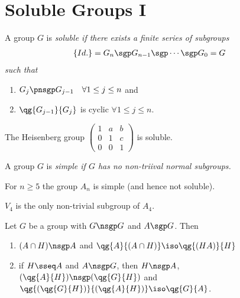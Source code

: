 \documentclass[a4paper]{article}
\begin{document}
\section{Soluble Groups I}

\begin{tdefinition}
  A group \( G \) is \it{soluble} if there exists a finite series of subgroups \begin{align*}
    \left\{ Id. \right\} &= G_n \sgp G_{n-1} \sgp \cdots \sgp G_0 = G
  \end{align*}
  such that \begin{enumerate}
    \item \( G_j \pnsgp G_{j-1} \quad \forall 1\le j\le n \) and
    \item \( \qg{G_{j-1}}{G_j} \) is cyclic \( \forall 1\le j\le n  \).
  \end{enumerate}
\end{tdefinition}

\begin{texercise}
  The Heisenberg group \( \begin{pmatrix}
    1 & a &b \\ 0 &1 &c \\ 0 & 0 & 1
  \end{pmatrix} \) is soluble.
\end{texercise}

\begin{tdefinition}
  A group \( G \) is \it{simple} if \( G \) has no non-triival normal subgroups.
\end{tdefinition}

\begin{tlemma}
  For \( n\geq 5 \) the group \( A_n \) is simple (and hence not soluble).
\end{tlemma}

\begin{texercise}
  \( V_4 \) is the only non-trivial subgroup of \( A_4 \).
\end{texercise}

\begin{tlemma}
  Let \( G \) be a group with \( G\nsgp G \) and \( A\sgp G \).
  Then
  \begin{enumerate}
    \item \( (A\cap H)\nsgp A \) and \( \qg{A}{(A\cap H)}\iso \qg{(HA)}{H} \)
    \item if \( H\sseq A \) and \( A\nsgp G \), then \( H\nsgp A \), \( (\qg{A}{H})\nsgp (\qg{G}{H}) \) and \( \qg{(\qg{G}{H})}{(\qg{A}{H})}\iso \qg{G}{A} \).
  \end{enumerate}
\end{tlemma}
\end{document}
